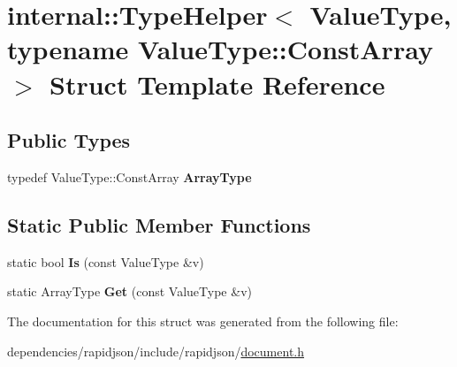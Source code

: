 \hypertarget{structinternal_1_1_type_helper_3_01_value_type_00_01typename_01_value_type_1_1_const_array_01_4}{}\section{internal\+:\+:Type\+Helper$<$ Value\+Type, typename Value\+Type\+:\+:Const\+Array $>$ Struct Template Reference}
\label{structinternal_1_1_type_helper_3_01_value_type_00_01typename_01_value_type_1_1_const_array_01_4}
\subsection*{Public Types}
\begin{DoxyCompactItemize}
\item 
\mbox{\label{structinternal_1_1_type_helper_3_01_value_type_00_01typename_01_value_type_1_1_const_array_01_4_a88c3a7bbff09fdd44ce6980f8122ba05}} 
typedef Value\+Type\+::\+Const\+Array {\bfseries Array\+Type}
\end{DoxyCompactItemize}
\subsection*{Static Public Member Functions}
\begin{DoxyCompactItemize}
\item 
\mbox{\label{structinternal_1_1_type_helper_3_01_value_type_00_01typename_01_value_type_1_1_const_array_01_4_a259497292f89c58789b1e947249dd299}} 
static bool {\bfseries Is} (const Value\+Type \&v)
\item 
\mbox{\label{structinternal_1_1_type_helper_3_01_value_type_00_01typename_01_value_type_1_1_const_array_01_4_a247811db25d6f25cc63175e03d847b8b}} 
static Array\+Type {\bfseries Get} (const Value\+Type \&v)
\end{DoxyCompactItemize}


The documentation for this struct was generated from the following file\+:\begin{DoxyCompactItemize}
\item 
dependencies/rapidjson/include/rapidjson/\hyperlink{document_8h}{document.\+h}\end{DoxyCompactItemize}

